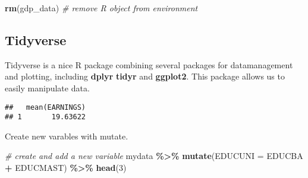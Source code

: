 \documentclass[
]{article}
\newenvironment{Shaded}{\begin{snugshade}}{\end{snugshade}}
\newcommand{\AttributeTok}[1]{\textcolor[rgb]{0.13,0.29,0.53}{#1}}
\newcommand{\CommentTok}[1]{\textcolor[rgb]{0.56,0.35,0.01}{\textit{#1}}}
\newcommand{\ControlFlowTok}[1]{\textcolor[rgb]{0.13,0.29,0.53}{\textbf{#1}}}
\newcommand{\DecValTok}[1]{\textcolor[rgb]{0.00,0.00,0.81}{#1}}
\newcommand{\FunctionTok}[1]{\textcolor[rgb]{0.13,0.29,0.53}{\textbf{#1}}}
\newcommand{\NormalTok}[1]{#1}
\newcommand{\SpecialCharTok}[1]{\textcolor[rgb]{0.81,0.36,0.00}{\textbf{#1}}}
\newcommand{\StringTok}[1]{\textcolor[rgb]{0.31,0.60,0.02}{#1}}
\begin{document}
\begin{Shaded}
\begin{Highlighting}[]
\FunctionTok{rm}\NormalTok{(gdp\_data) }\CommentTok{\# remove R object from environment}
\end{Highlighting}
\end{Shaded}

\hypertarget{tidyverse}{%
\subsection{Tidyverse}\label{tidyverse}}

Tidyverse is a nice R package combining several packages for
datamanagement and plotting, including \textbf{dplyr} \textbf{tidyr} and
\textbf{ggplot2}. This package allows us to easily manipulate data.

\begin{Shaded}
\end{Shaded}

\begin{verbatim}
##   mean(EARNINGS)
## 1       19.63622
\end{verbatim}

Create new varables with mutate.

\begin{Shaded}
\begin{Highlighting}[]
\CommentTok{\# create and add a new variable}
\NormalTok{mydata }\SpecialCharTok{\%\textgreater{}\%} 
  \FunctionTok{mutate}\NormalTok{(}\AttributeTok{EDUCUNI =}\NormalTok{ EDUCBA }\SpecialCharTok{+}\NormalTok{ EDUCMAST) }\SpecialCharTok{\%\textgreater{}\%}
  \FunctionTok{head}\NormalTok{(}\DecValTok{3}\NormalTok{)}
\end{Highlighting}
\end{Shaded}
\end{document}
